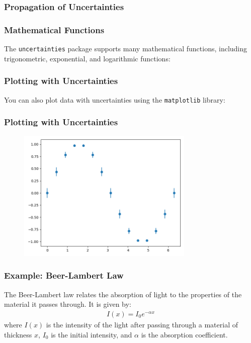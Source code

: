 \documentclass{beamer}
\begin{document}
\begin{frame}
  \frametitle{Propagation of Uncertainties}
  
\end{frame}

\begin{frame}
  \frametitle{Mathematical Functions}
  The \texttt{uncertainties} package supports many mathematical functions, including trigonometric, exponential, and logarithmic functions:
  
\end{frame}


\begin{frame}
  \frametitle{Plotting with Uncertainties}
  You can also plot data with uncertainties using the \texttt{matplotlib} library:
  
\end{frame}

\begin{frame}
  \frametitle{Plotting with Uncertainties}
  \vspace{-5mm}
  \begin{figure}
    \centering
    \includegraphics[width=0.75\textwidth]{examples/fig/plot.png}
  \end{figure}
\end{frame}

\begin{frame}
  \frametitle{Example: Beer-Lambert Law}
  The Beer-Lambert law relates the absorption of light to the properties of the material it passes through. It is given by:
  \begin{align*}
    I(x) = I_0 e^{-\alpha x}
  \end{align*}
  where $I(x)$ is the intensity of the light after passing through a material of thickness $x$, $I_0$ is the initial intensity, and $\alpha$ is the absorption coefficient.\\
\end{frame}
\end{document}
